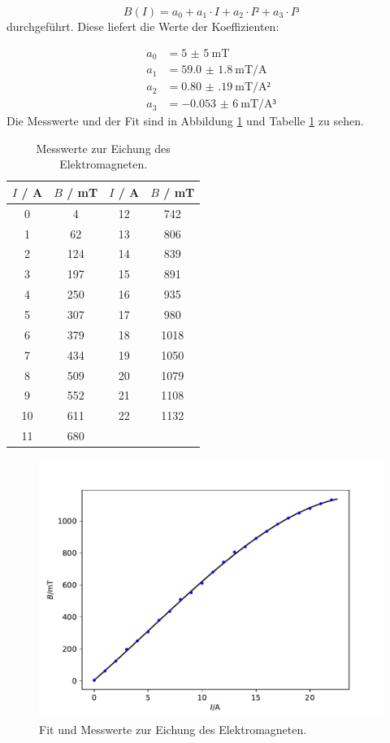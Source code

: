 \begin{equation}
  B(I) = a_0 + a_1 \cdot I + a_2 \cdot I² + a_3 \cdot I³
  \label{eq:B}
\end{equation}
durchgeführt. Diese liefert die Werte der Koeffizienten:

\begin{align*}
  a_0 &= \SI{5(5)}{\milli\tesla} \\
  a_1 &= \SI{59.0(18)}{\milli\tesla\per\ampere} \\
  a_2 &= \SI{0.80(19)}{\milli\tesla\per\ampere²} \\
  a_3 &= \SI{-0,053(6)}{\milli\tesla\per\ampere³}
\end{align*}
Die Messwerte und der Fit sind in Abbildung \ref{abb:1} und Tabelle \ref{tab:1} zu sehen.

\begin{table}
  \centering
  \caption{Messwerte zur Eichung des Elektromagneten.}
  \label{tab:1}
  \begin{tabular}{c c | c c}
    \toprule
    $I$ / \si{\ampere} & $B$ / \si{\milli\tesla} & $I$ / \si{\ampere} & $B$ / \si{\milli\tesla} \\
    \midrule
    0 & 4  & 12 & 742 \\
    1 & 62 & 13 & 806 \\
    2 & 124 & 14 & 839 \\
    3 & 197 & 15 & 891 \\
    4 & 250 & 16 & 935 \\
    5 & 307 & 17 & 980 \\
    6 & 379 & 18 & 1018 \\
    7 & 434 & 19 & 1050 \\
    8 & 509 & 20 & 1079 \\
    9 & 552 & 21 & 1108 \\
    10 & 611& 22 & 1132 \\
    11 & 680 \\
    \bottomrule
  \end{tabular}
\end{table}

\begin{figure}
  \centering
  \includegraphics[scale=0.7]{Magnetfeld.pdf}
  \caption{Fit und Messwerte zur Eichung des Elektromagneten.}
  \label{abb:1}
\end{figure}


